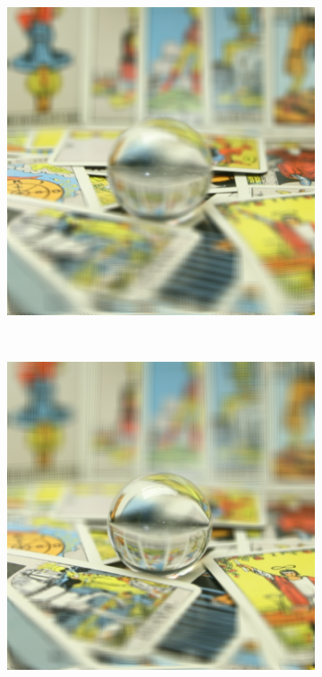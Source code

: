 \documentclass[11pt,a4paper,titlepage]{article}
\begin{document}
\begin{figure}
\begin{subfigure}[t]{0.19\textwidth}
	\end{subfigure}%
	~
	\begin{subfigure}[t]{0.19\textwidth}
		\includegraphics[width=\textwidth]{results/tarot_back_projection/sensorPlaneZ=-3/Back_Projection_layer_2.png} 
	\end{subfigure}%
	~
	\begin{subfigure}[t]{0.19\textwidth}
		\includegraphics[width=\textwidth]{results/tarot_back_projection/sensorPlaneZ=-3/Back_Projection_layer_3.png} 

\end{subfigure}
\end{figure}
\end{document}
